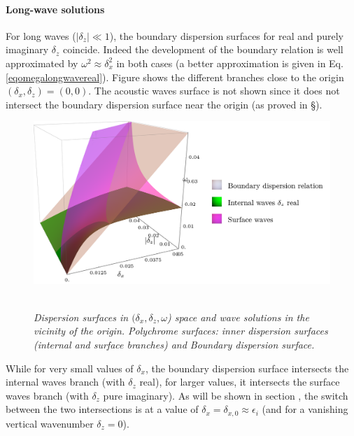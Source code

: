 \paragraph{Long-wave solutions}
For long waves ($|\delta_z| \ll 1$), the boundary dispersion surfaces for real and purely imaginary $\delta_z$ coincide. Indeed the development of the boundary relation is well approximated by $\omega^2\approx \delta_x^2$ in both cases (a better approximation is given in Eq. \ref{eqomegalongwavereal}).
Figure  shows the different branches close to the origin $(\delta_x, \delta_z)=(0,0)$. The acoustic waves surface is not shown since it does not intersect the boundary dispersion surface near the origin (as proved in \S{}).
\begin{figure}[!h]
	\centering		
		\includegraphics[width=0.6\linewidth]{FIGURES/boundedorigin.png}
	~
	
	\caption{\textit{Dispersion surfaces in $(\delta_x, \delta_z, \omega$) space and wave solutions in the vicinity of the origin. Polychrome surfaces: inner dispersion surfaces (internal and surface branches) and Boundary dispersion surface.
		}
	}
	\label{FigDisLongpSolutions}
\end{figure}
While for very small values of $\delta_x$, the boundary dispersion surface intersects the internal waves branch (with $\delta_z$ real), for larger values, it intersects the surface waves branch (with $\delta_z$ pure imaginary). As will be shown in section , the switch between the two intersections is at a value of $\delta_x=\delta_{x,0}\approx \epsilon_i$ (and for a vanishing vertical wavenumber $\delta_z=0$).
